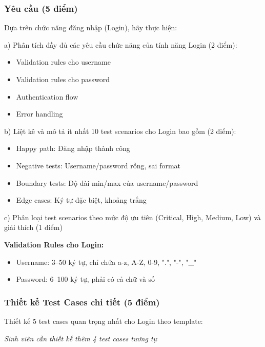 \documentclass[a4paper,12pt]{article}
\begin{document}
\subsubsection{Yêu cầu (5 điểm)}

Dựa trên chức năng đăng nhập (Login), hãy thực hiện:

a) Phân tích đầy đủ các yêu cầu chức năng của tính năng Login (2 điểm):

\begin{itemize}
    \item Validation rules cho username
    \item Validation rules cho password
    \item Authentication flow
    \item Error handling
\end{itemize}

b) Liệt kê và mô tả ít nhất 10 test scenarios cho Login bao gồm (2 điểm):

\begin{itemize}
    \item Happy path: Đăng nhập thành công
    \item Negative tests: Username/password rỗng, sai format
    \item Boundary tests: Độ dài min/max của username/password
    \item Edge cases: Ký tự đặc biệt, khoảng trắng
\end{itemize}

c) Phân loại test scenarios theo mức độ ưu tiên (Critical, High, Medium, Low) và giải thích (1 điểm)

\vspace{10pt}
\textbf{Validation Rules cho Login:}

\begin{itemize}
    \item Username: 3--50 ký tự, chỉ chứa a-z, A-Z, 0-9, ".", "-", "\_"
    \item Password: 6--100 ký tự, phải có cả chữ và số
\end{itemize}

\subsubsection{Thiết kế Test Cases chi tiết (5 điểm)}

Thiết kế 5 test cases quan trọng nhất cho Login theo template: 

\textit{Sinh viên cần thiết kế thêm 4 test cases tương tự}
\end{document}
